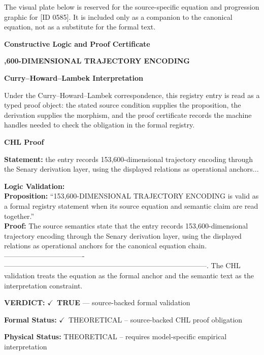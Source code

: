 \begingroup\footnotesize\sloppy
The visual plate below is reserved for the source-specific equation and progression graphic for [ID 0585]. It is included only as a companion to the canonical equation, not as a substitute for the formal text.
\par\endgroup
\ifTZPDarkEdition
{}
\fi

\clearpage
\begingroup\tzpsupportsetup
\noindent\textbf{\fontsize{10.8pt}{12.8pt}\selectfont [ID 0585] Constructive Logic and Proof Certificate}\par
\noindent\textbf{\fontsize{10pt}{12pt},600-DIMENSIONAL TRAJECTORY ENCODING}\par
\vspace{0.45em}
\begingroup
\footnotesize
\setlength{\parskip}{0.22em}
\setlength{\parindent}{0pt}
\noindent\textbf{Curry--Howard--Lambek Interpretation}\par
Under the Curry--Howard--Lambek correspondence, this registry entry is read as a typed proof
object: the stated source condition supplies the proposition, the derivation supplies the
morphism, and the proof certificate records the machine handles needed to check the obligation
in the formal registry.

\vspace{0.45em}
\noindent\textbf{CHL Proof}\par
\textbf{Statement:} the entry records 153,600-dimensional trajectory encoding through the Senary derivation
layer, using the displayed relations as operational anchors...

\textbf{Logic Validation:}\\
\textbf{Proposition:} ``153,600-DIMENSIONAL TRAJECTORY ENCODING is valid as a formal registry statement when its
source equation and semantic claim are read together.''\\
\textbf{Proof:} The source semantics state that the entry records 153,600-dimensional trajectory
encoding through the Senary derivation layer, using the displayed relations as
operational anchors for the canonical equation chain. ----------------------------------
--------------------------------------------------------------------------------------.
The CHL validation treats the equation as the formal anchor and the semantic text as the
interpretation constraint.

\textbf{VERDICT:} \ensuremath{\checkmark}\ \textbf{TRUE} --- source-backed formal validation

\textbf{Formal Status:} \ensuremath{\checkmark}\ THEORETICAL -- source-backed CHL proof obligation

\textbf{Physical Status:} THEORETICAL -- requires model-specific empirical interpretation
\par\vspace{0.45em}
\par
\ifTZPDarkEdition
{}
\fi
\endgroup
\endgroup
